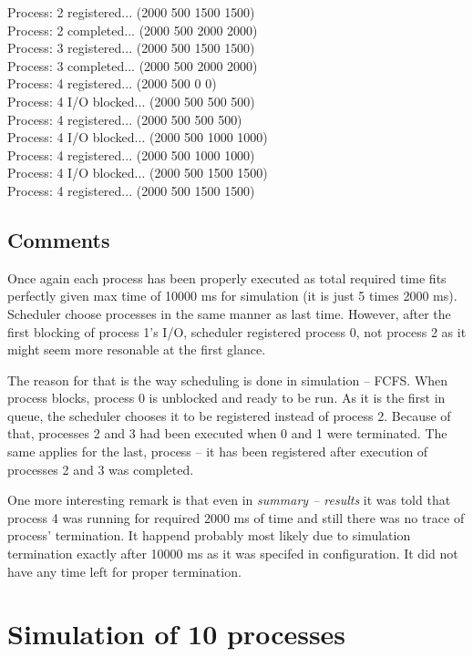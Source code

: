 \documentclass{article}
\begin{document}
Process: 2 registered... (2000 500 1500 1500)\\
Process: 2 completed... (2000 500 2000 2000)\\
Process: 3 registered... (2000 500 1500 1500)\\
Process: 3 completed... (2000 500 2000 2000)\\
Process: 4 registered... (2000 500 0 0)\\
Process: 4 I/O blocked... (2000 500 500 500)\\
Process: 4 registered... (2000 500 500 500)\\
Process: 4 I/O blocked... (2000 500 1000 1000)\\
Process: 4 registered... (2000 500 1000 1000)\\
Process: 4 I/O blocked... (2000 500 1500 1500)\\
Process: 4 registered... (2000 500 1500 1500)

\rmfamily

\subsection{Comments}
Once again each process has been properly executed as total required time fits perfectly
given max time of 10000 ms for simulation (it is just 5 times 2000 ms). Scheduler choose
processes in the same manner as last time. However, after the first blocking of process 1's
I/O, scheduler registered process 0, not process 2 as it might seem more resonable at the
first glance. 

The reason for that is the way scheduling is done in simulation -- FCFS.
When process blocks, process 0 is unblocked and ready to be run. As it is the first in queue,
the scheduler chooses it to be registered instead of process 2. Because of that,
processes 2 and 3 had been executed when 0 and 1 were terminated. The same applies for the last,
 process -- it has been registered after execution of processes 2 and 3 was completed.

One more interesting remark is that even in \emph{summary -- results} it was told that
process 4 was running for required 2000 ms of time and still there was no trace of process'
termination. It happend probably most likely due to simulation termination exactly after 10000 ms
as it was specifed in configuration. It did not have any time left for proper termination.

\section{Simulation of 10 processes}
\end{document}
